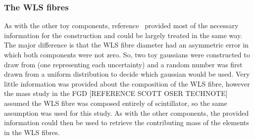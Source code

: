\subsubsection{The WLS fibres}
\label{subsubsec:ECalMassWLSFibres}
As with the other toy components, reference~\cite{1748-0221-8-10-P10019} provided most of the necessary information for the construction and could be largely treated in the same way.  The major difference is that the WLS fibre diameter had an asymmetric error in which both components were not zero.  So, two toy gaussians were constructed to draw from (one representing each uncertainty) and a random number was first drawn from a uniform distribution to decide which gaussian would be used.  Very little information was provided about the composition of the WLS fibre, however the mass study in the FGD [REFERENCE SCOTT OSER TECHNOTE] assumed the WLS fibre was composed entirely of scintillator, so the same assumption was used for this study.  As with the other components, the provided information could then be used to retrieve the contributing mass of the elements in the WLS fibres.

